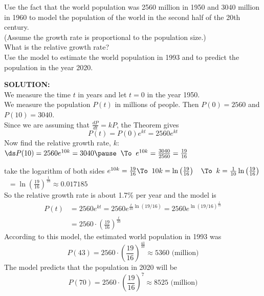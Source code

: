 \begin{frame}
\begin{example}
Use the fact that the world population was 2560 million in 1950 and 3040 
million in 1960 to model the population of the world in the second 
half of the 20th century. \\
(Assume the growth rate is proportional to the population size.) \\

What is the relative growth rate? \\

Use the model to estimate the world population in 1993 and to predict the
 population in the year 2020.
\end{example}
\textbf{SOLUTION:}\\ \pause 
We measure the time $t$ in years and let $t = 0$ in the year 1950.\\ \pause
We measure the population $P(t)$ in millions of people. 
Then $P (0) = 2560$ and $P (10) = 3040$.
\\ \pause 
Since we are assuming that $\frac{dP}{dt} = kP$, the Theorem gives
 \[
P(t) = P(0)e^{kt} = 2560e^{kt}
\]      \pause   
Now find the relative growth rate, $k$:\\
$\ds  P(10) = 2560e^{10k}=3040 \pause\;\; \To\;\;  e^{10k}=\frac{3040}{2560}=\frac{19}{16}
 $
\end{frame}
\begin{frame}
take the logarithm of both sides \pause
$ e^{10k}=\frac{19}{16} \To\;\; 10k=\ln\left(\frac{19}{16}\right)\;\;$ \pause $\To\;\; k = \frac{1}{10}\ln\left(\frac{19}{16}\right)$\pause $ \;\; = \ln\left(\frac{19}{16}\right)^\frac{1}{10}$\pause $ \approx 0.017185$ \\ \pause 
So the relative growth rate is about 1.7\% per year and the model is
\begin{align*}
P(t) & =2560e^{kt}=2560e^{\frac{t}{10}\ln(19/16)}= 2560e^{\ln\left( 19/16 \right)^{\frac{t}{10}}}\\ 
& = 2560\cdot \left(\frac{19}{16}\right)^\frac{t}{10}
\end{align*}\pause
According to this model, the estimated  world population in 1993 was
\[
P(43)= 2560\cdot \left(\frac{19}{16}\right)^\frac{43}{10}\approx 5360 \text{ (million)}
\]
\pause
The model predicts that the population in 2020 will be
\[
P(70)= 2560\cdot \left(\frac{19}{16}\right)^7\approx 8525 \text{ (million)}
\]
\end{frame}
